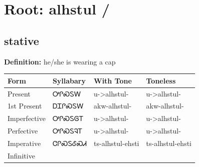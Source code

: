 \documentclass{article}%
\begin{document}
%
\normalsize%
\section*{Root: alhstul / }%
\subsection*{stative}%
\textbf{Definition: }%
he/she is wearing a cap%
\\[0.5em]%
\begin{tabular}{|l|l|l|l|}%
\hline%
\textbf{Form}&\textbf{Syllabary}&\textbf{With Tone}&\textbf{Toneless}\\%
\hline%
Present&ᎤᎵᏍᏚᎳ&u{-}>alhstul{-}&u{-}>alhstul{-}\\%
1st Present&ᎠᏆᎵᏍᏚᎳ&akw{-}alhstul{-}&akw{-}alhstul{-}\\%
Imperfective&ᎤᎵᏍᏚᎶᎢ&u{-}>alhstul{-}&u{-}>alhstul{-}\\%
Perfective&ᎤᎵᏍᏚᎸᎢ&u{-}>alhstul{-}&u{-}>alhstul{-}\\%
Imperative&ᏣᎵᏍᏚᎴᏍᏗ&ts{-}alhstul{-}ehsti&ts{-}alhstul{-}ehsti\\%
Infinitive&&&\\%
\hline%
\end{tabular}%
\\[1em]%
\end{document}
